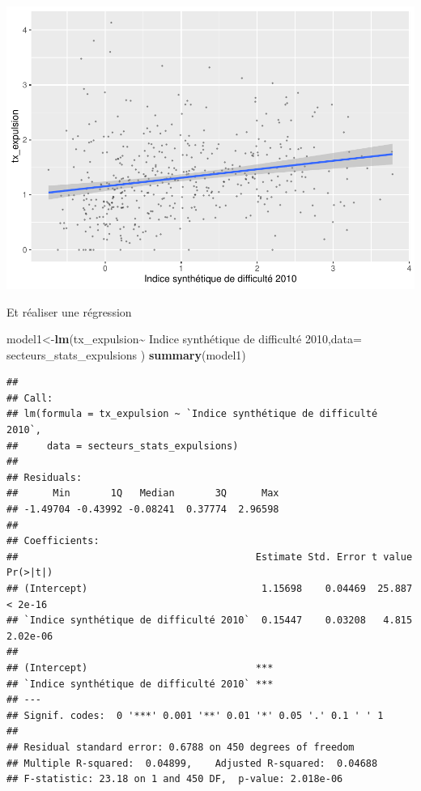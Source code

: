 \documentclass[
]{book}
\newenvironment{Shaded}{\begin{snugshade}}{\end{snugshade}}
\newcommand{\AttributeTok}[1]{\textcolor[rgb]{0.13,0.29,0.53}{#1}}
\newcommand{\FunctionTok}[1]{\textcolor[rgb]{0.13,0.29,0.53}{\textbf{#1}}}
\newcommand{\NormalTok}[1]{#1}
\newcommand{\OtherTok}[1]{\textcolor[rgb]{0.56,0.35,0.01}{#1}}
\newcommand{\SpecialCharTok}[1]{\textcolor[rgb]{0.81,0.36,0.00}{\textbf{#1}}}
\newcommand{\StringTok}[1]{\textcolor[rgb]{0.31,0.60,0.02}{#1}}
\begin{document}
\includegraphics{manuel_geo_quanti_files/figure-latex/unnamed-chunk-37-1.pdf}

Et réaliser une régression

\begin{Shaded}
\begin{Highlighting}[]
\NormalTok{model1}\OtherTok{\textless{}{-}}\FunctionTok{lm}\NormalTok{(tx\_expulsion}\SpecialCharTok{\textasciitilde{}} \StringTok{\textasciigrave{}}\AttributeTok{Indice synthétique de difficulté 2010}\StringTok{\textasciigrave{}}\NormalTok{,}\AttributeTok{data=}\NormalTok{ secteurs\_stats\_expulsions )}
\FunctionTok{summary}\NormalTok{(model1)}
\end{Highlighting}
\end{Shaded}

\begin{verbatim}
## 
## Call:
## lm(formula = tx_expulsion ~ `Indice synthétique de difficulté 2010`, 
##     data = secteurs_stats_expulsions)
## 
## Residuals:
##      Min       1Q   Median       3Q      Max 
## -1.49704 -0.43992 -0.08241  0.37774  2.96598 
## 
## Coefficients:
##                                         Estimate Std. Error t value Pr(>|t|)
## (Intercept)                              1.15698    0.04469  25.887  < 2e-16
## `Indice synthétique de difficulté 2010`  0.15447    0.03208   4.815 2.02e-06
##                                            
## (Intercept)                             ***
## `Indice synthétique de difficulté 2010` ***
## ---
## Signif. codes:  0 '***' 0.001 '**' 0.01 '*' 0.05 '.' 0.1 ' ' 1
## 
## Residual standard error: 0.6788 on 450 degrees of freedom
## Multiple R-squared:  0.04899,    Adjusted R-squared:  0.04688 
## F-statistic: 23.18 on 1 and 450 DF,  p-value: 2.018e-06
\end{verbatim}
\end{document}
